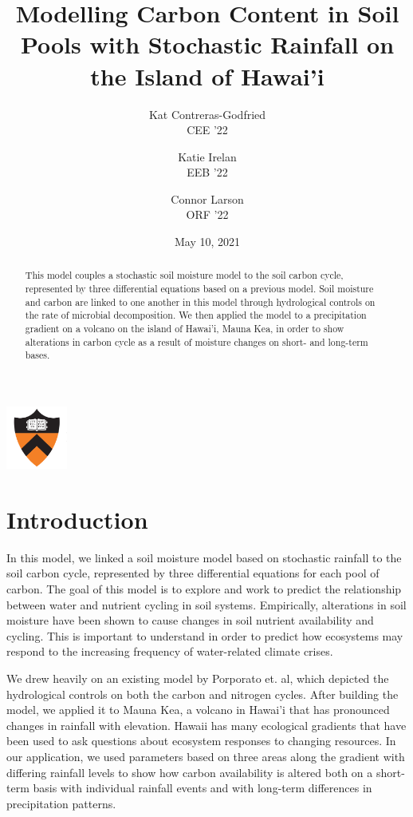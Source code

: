 \documentclass[12pt, letterpaper]{article}
\title{Modelling Carbon Content in Soil Pools with Stochastic Rainfall on the Island of Hawai'i}
\author{Kat Contreras-Godfried \\ CEE '22 \and 
        Katie Irelan \\ EEB '22 \and 
        Connor Larson \\ ORF '22}
\date{May 10, 2021}
\begin{document}
\maketitle

\begin{center}
    \includegraphics[width=0.15\textwidth]{shield.png}
\end{center}


\begin{abstract}
    This model couples a stochastic soil moisture model to the soil carbon cycle, represented by three differential equations based on a previous model. Soil moisture and carbon are linked to one another in this model through hydrological controls on the rate of microbial decomposition. We then applied the model to a precipitation gradient on a volcano on the island of Hawai’i, Mauna Kea, in order to show alterations in carbon cycle as a result of moisture changes on short- and long-term bases.
\end{abstract}

\section{Introduction}

In this model, we linked a soil moisture model based on stochastic rainfall to the soil carbon cycle, represented by three differential equations for each pool of carbon. The goal of this model is to explore and work to predict the relationship between water and nutrient cycling in soil systems. Empirically, alterations in soil moisture have been shown to cause changes in soil nutrient availability and cycling. \cite{kramer_controls_2016,schimel_life_2018} This is important to understand in order to predict how ecosystems may respond to the increasing frequency of water-related climate crises. \cite{oconnell_drought_2018}

We drew heavily on an existing model by Porporato et. al, which depicted the hydrological controls on both the carbon and nitrogen cycles. \cite{porporato_hydrologic_2003} After building the model, we applied it to Mauna Kea, a volcano in Hawai’i that has pronounced changes in rainfall with elevation. \cite{bateman_quantitative_2019} Hawaii has many ecological gradients that have been used to ask questions about ecosystem responses to changing resources. In our application, we used parameters based on three areas along the gradient with differing rainfall levels to show how carbon availability is altered both on a short-term basis with individual rainfall events and with long-term differences in precipitation patterns. 
\end{document}
